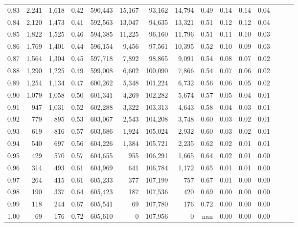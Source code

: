 \begin{tabular}{rrrrrrrrrrrrrrr}
0.83 &   2,241 &  1,618 &  0.42 &  590,443 &   15,167 &   93,162 &   14,794 &  0.49 &  0.14 &  0.14 &      0.04 \\
0.84 &   2,120 &  1,473 &  0.41 &  592,563 &   13,047 &   94,635 &   13,321 &  0.51 &  0.12 &  0.12 &      0.04 \\
0.85 &   1,822 &  1,525 &  0.46 &  594,385 &   11,225 &   96,160 &   11,796 &  0.51 &  0.11 &  0.10 &      0.03 \\
0.86 &   1,769 &  1,401 &  0.44 &  596,154 &    9,456 &   97,561 &   10,395 &  0.52 &  0.10 &  0.09 &      0.03 \\
0.87 &   1,564 &  1,304 &  0.45 &  597,718 &    7,892 &   98,865 &    9,091 &  0.54 &  0.08 &  0.07 &      0.02 \\
0.88 &   1,290 &  1,225 &  0.49 &  599,008 &    6,602 &  100,090 &    7,866 &  0.54 &  0.07 &  0.06 &      0.02 \\
0.89 &   1,254 &  1,134 &  0.47 &  600,262 &    5,348 &  101,224 &    6,732 &  0.56 &  0.06 &  0.05 &      0.02 \\
0.90 &   1,079 &  1,058 &  0.50 &  601,341 &    4,269 &  102,282 &    5,674 &  0.57 &  0.05 &  0.04 &      0.01 \\
0.91 &     947 &  1,031 &  0.52 &  602,288 &    3,322 &  103,313 &    4,643 &  0.58 &  0.04 &  0.03 &      0.01 \\
0.92 &     779 &    895 &  0.53 &  603,067 &    2,543 &  104,208 &    3,748 &  0.60 &  0.03 &  0.02 &      0.01 \\
0.93 &     619 &    816 &  0.57 &  603,686 &    1,924 &  105,024 &    2,932 &  0.60 &  0.03 &  0.02 &      0.01 \\
0.94 &     540 &    697 &  0.56 &  604,226 &    1,384 &  105,721 &    2,235 &  0.62 &  0.02 &  0.01 &      0.01 \\
0.95 &     429 &    570 &  0.57 &  604,655 &      955 &  106,291 &    1,665 &  0.64 &  0.02 &  0.01 &      0.00 \\
0.96 &     314 &    493 &  0.61 &  604,969 &      641 &  106,784 &    1,172 &  0.65 &  0.01 &  0.01 &      0.00 \\
0.97 &     264 &    415 &  0.61 &  605,233 &      377 &  107,199 &      757 &  0.67 &  0.01 &  0.00 &      0.00 \\
0.98 &     190 &    337 &  0.64 &  605,423 &      187 &  107,536 &      420 &  0.69 &  0.00 &  0.00 &      0.00 \\
0.99 &     118 &    244 &  0.67 &  605,541 &       69 &  107,780 &      176 &  0.72 &  0.00 &  0.00 &      0.00 \\
1.00 &      69 &    176 &  0.72 &  605,610 &        0 &  107,956 &        0 &   nan &  0.00 &  0.00 &      0.00 \\
\bottomrule
\end{tabular}
